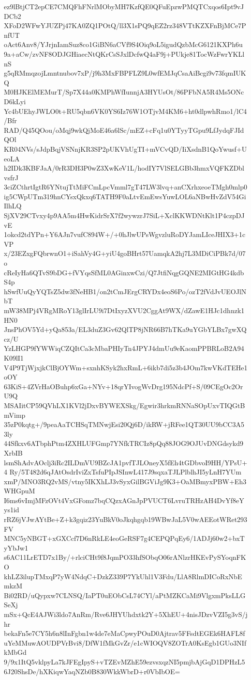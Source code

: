 ez9lBtjCT2epCE7CMQFhFNrlMObyMH7KzfQE0QFuEpzwPMQTCxqos6Ipt9vJDCb2
XFoD2WFwYJUZPj47KA0ZQ1POtQ/ll3X1sPQ9qEZ2rz348VTtKZXFnBjMCe7PnfUT
oAct6Anv8/YJrjnIamSuz8co1GiBN6aCVf9S4Oiq9oL5igudQzbMcG6121KXPh6u
9a+aCw/zvNF8ODJGHiaecNtQKrCsSJxlDcfwQ4aF9j+PUkje81TocWzFwrYKLlnS
g5qRMmqzojLmntnubov7xP/j9h3MxFBPFLZ9L0wfEMJqCsaAiBcgi9v73fqmIUKQ
M0HJKElMEMurT/Sp7X44a0KMPhWfIunnjA3HYUsOt/86PFbNA5R4Ms5ONcD6kLyi
Yc4bUEhyJWLO0t+RU5qbn6VK0YS6Iz76W1OTjvM4KM6+ht0dlpwhRmo1/lC4/Bfr
RAD/Q45QOou/oMqj9wkQjMoE46a6lSc/mEZ+cFq1u0YTyyTGpu9LfJydqFJIdQOl
KR04NVs/sJdpBqjVSNnjKR3SP2pUKVhUgTI+mVCvQD/IiXsdnB1QoYwusf+UeoLA
h2IDk3KBFJaA/0rR3DH3P0wZ3XwKeV1L/hodIY7VlSELGBb3hmxVQFKZDblvsfrJ
3ciZCthrtIgtR6YNtujTtMiFCmLpcVmml7gT47LW3lvq+anCXrhxeoeTMgh0mlp0
ig5CWpUTm319hnCYsxQkxq6TATH9F0aLtvEmEwsYuwLOL6aNBwHvZdV54GiIlhLQ
SjXV29CTvxy4p9AA5m4HwKidrSrX7f2wywzrJ7SiL+XclKKWDNtKlt1P4czpDJvE
1okcd2tdYPn+Y6AJn7vufC894W+/+0hJlwUPsWgvzluRoDYJamLIceJHIX3+1cVP
x/23EZxgFQbrwnO1+iSahVy4G+yiU4goBHrt57UamqkA2hj7L3MDiCiPBk7d/07o
cReIyHa6QTvS9bDG+fVYqsSfML0AGinxwCzi/Q7JtfiNqgGQNE2MIGtHG4kdbS4p
hSwfUuQyYQTsZ5dw3fNeHB1/on2tCmJErgCRYDx4eoS6Po/ozT2fVdJvUEOJlNbT
mW38MPj4VRgMRoY13glIrLU9i7DtIxyzXVU2CggAt9WX/dZawE1HJc1dhnzk1HN0
JnsPhOV5Yd+yQa853a/EL3duZ3Gv62QlTP8jNR66B7hTKa9uYGbYLBx7gwXQcz/U
YzLHGP9fYWWiqCZQItCa3cMbaPHIyTn4JPYJ4dmUu9eKaomPPBRLoB2A94K09lI1
V4P9TjWjxjkClBjOYWm+sxnhKSyk2hxRmL+6ikb7di5z3b4JOm7kwVKdTEHe1oOY
63KiS+4ZVrHaOBuhp6xGa+NYv+18qrYIvogWvDrg195NdcPf+S/09CEgOc2OrU9Q
MSAIitCP59QVhLX1KVl2jDxvBYWEXSkg/Egwir3hrkmRNNaSOpUxvTIQGtBmVimp
35zP0kqtg+/9peaAaTCHSqTMNwjEsi20Qj6D/ikRW+jRFee1QT30UU9bCC3A53ly
44Sfkxv6ATbphPtm4ZXHLUFGmp7YNfkTRCIz8pQq88JOG9OJUvDNGdsykd9XrbIB
lsmShAdvAOclj3iRc2ILDmVU9BZcJA1pvfTJLOneyX5fEh4tGDbvoI9HH/YPsU+4
Ry/5T482d6qJAtOsdrIviZxTsfuPIpJSInwL417J9sqxaTJLPlblhJI5yLnH7YUm
xmP/MNO3RQ2vMS/vtny5IKXhLJ3vSyxGilBGViJg9K3+OaMBmyxPBW+Eh3WHGpuM
I6ms6vImjMFzOVt4VxGFomz7bqCQzxAGnJpPVUCT6LvruTRHzAH4DvYf8eYys1id
rRZ6jVJwAYtBe+Z+k3gqiz23YuBkV0oJkqhgqb19WBwJaL5V0wAEEotWRet293FV
MNC5yNBGT+xGXCcf7D6nRkLE4eoGeRSF7g4CEPQPqEy6/1ADJj60w2+bxTyYbJw1
s6AC11LrETD7x1By/+rlciCHt9f8JqmPO33hfSObqO06rANlzrHKEvPySYoqnFKO
khLZ3ilupTMxqP7yW4NdqC+DzkZ339P7YkUhl1V3Fdu/LlA8RlmDICoRxNbEmkzM
Bi02RD/uQypxw7CLNSQ/IaPT0uEObCsL74CYl/aPtMZKCaMi9VlgxmPksLLGSeXj
mSx+QcE4AJWi3ldo7AnRm/Rve6JHYUhdxtk2Y+5XhEU+4nisJDzvVZI5g3vS/jhr
bekaFn5e7CY5h6n8lInFgbn1w4de7eMaCpwyPOuD0Ajtrav5FFsdtEGEk6HAFL8f
uYeMMuwAOUDPVrBvi8/DfW1fMkGvZr/e1cWIOQV8ZOTrA0KsEgb1GUo3NIfkMbGd
9/9x1ItQ5vklpyLa7kJFEgIpyS+vTZEvMZhE59ezvsxqzNI5pmjbAjGqD1DPHzL5
6J20ShsDe/hXKiqwYaqNZb0B830WkkWbrD+r0VbIbOE=
